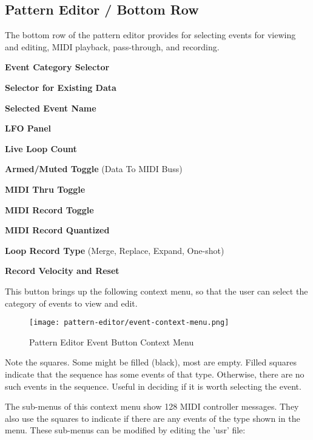 \subsection{Pattern Editor / Bottom Row}
\label{subsec:pattern_editor_bottom}

   The bottom row of the pattern editor provides for
   selecting events for viewing and editing, MIDI playback,
   pass-through, and recording.

   \begin{enumber}
      \item \textbf{Event Category Selector}
      \item \textbf{Selector for Existing Data}
      \item \textbf{Selected Event Name}
      \item \textbf{LFO Panel}
      \item \textbf{Live Loop Count}
      \item \textbf{Armed/Muted Toggle} (Data To MIDI Buss)
      \item \textbf{MIDI Thru Toggle}
      \item \textbf{MIDI Record Toggle}
      \item \textbf{MIDI Record Quantized}
      \item \textbf{Loop Record Type} (Merge, Replace, Expand, One-shot)
      \item \textbf{Record Velocity and Reset}
   \end{enumber}

   \setcounter{ItemCounter}{0}      %

   This button brings up the following context menu, so that the user can
   select the category of events to view and edit.

\begin{figure}[H]
   \centering 
   \texttt{[image: pattern-editor/event-context-menu.png]}
   \caption{Pattern Editor Event Button Context Menu}
   \label{fig:pattern_editor_bottom_event_context_menu}
\end{figure}

   Note the squares.  Some might be filled (black), most are empty.
   Filled squares indicate that the sequence has some events of that type.
   Otherwise, there are no such events in the sequence.
   Useful in deciding if it is worth selecting the event.

   The sub-menus of this context menu show 128 MIDI controller messages.
   They also use the squares to
   indicate if there are any events of the type shown in the menu.
   These sub-menus can be modified by editing the 'usr' file:
   

